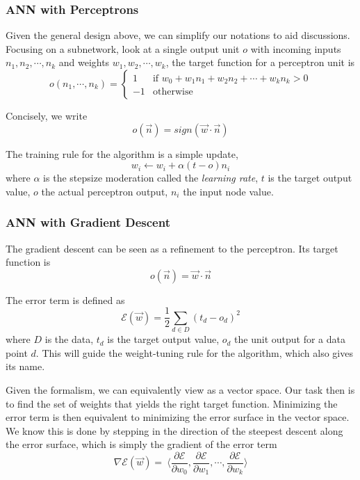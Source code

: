\documentclass[12pt]{article}  %
\begin{document}
\subsubsection{ANN with Perceptrons}

Given the general design above, we can simplify our notations to aid discussions. Focusing on a subnetwork, look at a single output unit $o$ with incoming inputs $n_1, n_2, \cdots, n_k$ and weights $w_1, w_2, \cdots, w_k$, the target function for a perceptron unit is
\[
o(n_1, \cdots, n_k) =
\begin{cases}
1 &\text{if } w_0 + w_1 n_1 + w_2 n_2 + \cdots + w_k n_k > 0\\
-1 &\text{otherwise }
\end{cases}
\]

Concisely, we write $$o(\vec{n}) = sign(\vec{w} \cdot \vec{n})$$

The training rule for the algorithm is a simple update, $$w_i \leftarrow w_i + \alpha(t-o)n_i$$ where $\alpha$ is the stepsize moderation called the {\em learning rate}, $t$ is the target output value, $o$ the actual perceptron output, $n_i$ the input node value.




\subsubsection{ANN with Gradient Descent}

The gradient descent can be seen as a refinement to the perceptron. Its target function is $$o(\vec{n}) = \vec{w} \cdot \vec{n}$$

The error term is defined as $$\mathcal{E}(\vec{w}) = \frac{1}{2} \sum_{d \in D} (t_d - o_d)^2$$ where $D$ is the data, $t_d$ is the target output value, $o_d$ the unit output for a data point $d$. This will guide the weight-tuning rule for the algorithm, which also gives its name.

Given the formalism, we can equivalently view as a vector space. Our task then is to find the set of weights that yields the right target function. Minimizing the error term is then equivalent to minimizing the error surface in the vector space. We know this is done by stepping in the direction of the steepest descent along the error surface, which is simply the gradient of the error term $$\nabla \mathcal{E}(\vec{w}) =\ \langle  \frac{\partial \mathcal{E}}{\partial w_0}, \frac{\partial \mathcal{E}}{\partial w_1}, \cdots, \frac{\partial \mathcal{E}}{\partial w_k}  \rangle$$
\end{document}
